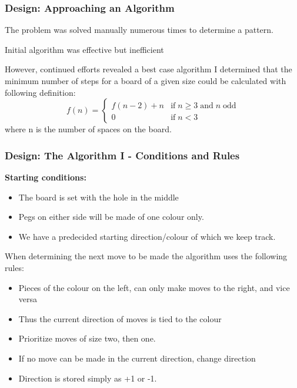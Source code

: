 \documentclass{beamer}
\begin{document}
	\begin{frame}
		\frametitle{Design: Approaching an Algorithm}
		The problem was solved manually numerous times to determine a pattern.
		\blt
			\item Initial algorithm was effective but inefficient
			\item However, continued efforts revealed a best case algorithm
		\finblt
		\vfill
		I determined that the minimum number of steps for a board of a given size could be calculated with following definition:
		\[
		f(n) = 
			\begin{cases} 
				f(n - 2) + n & \textrm{if}\; n \geq 3 \;\textrm{and}\; n \;\textrm{odd}\\
				0 & \textrm{if}\; n < 3
		 	\end{cases}
		\]
		where n is the number of spaces on the board.		
		
	\end{frame}
	
	\begin{frame}
		\frametitle{Design: The Algorithm I - Conditions and Rules}
		\textbf{Starting conditions:} 
		\begin{itemize}
		\item The board is set with the hole in the middle
		\item Pegs on either side will be made of one colour only. 
		\item We have a predecided starting direction/colour of which we keep track. 
		\end{itemize}
		
		When determining the next move to be made the algorithm uses the following rules:
		\begin{itemize}
			\item Pieces of the colour on the left, can only make moves to the right, and vice versa
			\item Thus the current direction of moves is tied to the colour
			\item Prioritize moves of size two, then one. 
			\item If no move can be made in the current direction, change direction
			\item Direction is stored simply as +1 or -1. 
		\end{itemize}
		
	\end{frame}
	
\end{document}
